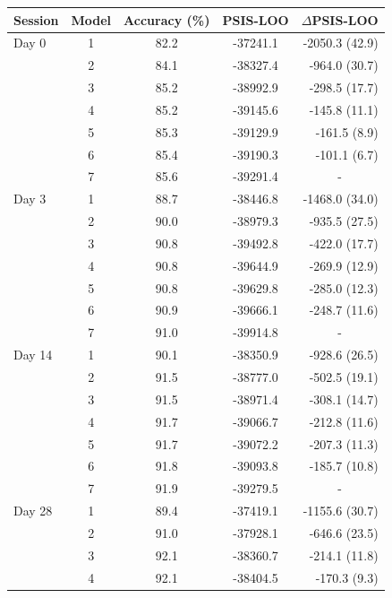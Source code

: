 \documentclass[a4paper,12pt]{article}
\begin{document}
\begin{refsection}[supp]
\begin{table}[h!]
    \centering
    \small
    \begin{tabular}{lcccr}
        \toprule
        Session & Model & Accuracy (\%) & PSIS-LOO & \multicolumn{1}{c}{$\Delta$PSIS-LOO} \\
        \midrule
         Day 0 & 1 & 82.2 & -37241.1 & -2050.3 (42.9) \\
         & 2 & 84.1 & -38327.4 & -964.0 (30.7) \\
         & 3 & 85.2 & -38992.9 & -298.5 (17.7) \\
         & 4 & 85.2 & -39145.6 & -145.8 (11.1) \\
         & 5 & 85.3 & -39129.9 & -161.5 (8.9) \\
         & 6 & 85.4 & -39190.3 & -101.1 (6.7) \\
         & 7 & 85.6 & -39291.4 & \multicolumn{1}{c}{-} \\
         \midrule
         Day 3 & 1 & 88.7 & -38446.8 & -1468.0 (34.0) \\
         & 2 & 90.0 & -38979.3 & -935.5 (27.5) \\
         & 3 & 90.8 & -39492.8 & -422.0 (17.7) \\
         & 4 & 90.8 & -39644.9 & -269.9 (12.9) \\
         & 5 & 90.8 & -39629.8 & -285.0 (12.3) \\
         & 6 & 90.9 & -39666.1 & -248.7 (11.6) \\
         & 7 & 91.0 & -39914.8 & \multicolumn{1}{c}{-} \\
         \midrule
         Day 14 & 1 & 90.1 & -38350.9 & -928.6 (26.5) \\
         & 2 & 91.5 & -38777.0 & -502.5 (19.1) \\
         & 3 & 91.5 & -38971.4 & -308.1 (14.7) \\
         & 4 & 91.7 & -39066.7 & -212.8 (11.6) \\
         & 5 & 91.7 & -39072.2 & -207.3 (11.3) \\
         & 6 & 91.8 & -39093.8 & -185.7 (10.8) \\
         & 7 & 91.9 & -39279.5 & \multicolumn{1}{c}{-} \\
         \midrule
         Day 28 & 1 & 89.4 & -37419.1 & -1155.6 (30.7) \\
         & 2 & 91.0 & -37928.1 & -646.6 (23.5) \\
         & 3 & 92.1 & -38360.7 & -214.1 (11.8) \\
         & 4 & 92.1 & -38404.5 & -170.3 (9.3) \\

\end{tabular}
\end{table}
\end{refsection}
\end{document}
